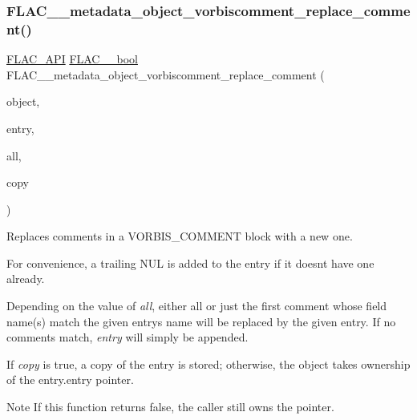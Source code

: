 \subsubsection{\texorpdfstring{FLAC\_\_metadata\_object\_vorbiscomment\_replace\_comment()}{FLAC\_\_metadata\_object\_vorbiscomment\_replace\_comment()}}
{\footnotesize\ttfamily \mbox{\hyperlink{group__flac__export_ga56ca07df8a23310707732b1c0007d6f5}{F\+L\+A\+C\+\_\+\+A\+PI}} \mbox{\hyperlink{ordinals_8h_a95103469f1cbd78b8cf250194985b34e}{F\+L\+A\+C\+\_\+\+\_\+bool}} F\+L\+A\+C\+\_\+\+\_\+metadata\+\_\+object\+\_\+vorbiscomment\+\_\+replace\+\_\+comment (\begin{DoxyParamCaption}\item[{\mbox{\hyperlink{struct_f_l_a_c_____stream_metadata}{F\+L\+A\+C\+\_\+\+\_\+\+Stream\+Metadata}} $\ast$}]{object,  }\item[{\mbox{\hyperlink{struct_f_l_a_c_____stream_metadata___vorbis_comment___entry}{F\+L\+A\+C\+\_\+\+\_\+\+Stream\+Metadata\+\_\+\+Vorbis\+Comment\+\_\+\+Entry}}}]{entry,  }\item[{\mbox{\hyperlink{ordinals_8h_a95103469f1cbd78b8cf250194985b34e}{F\+L\+A\+C\+\_\+\+\_\+bool}}}]{all,  }\item[{\mbox{\hyperlink{ordinals_8h_a95103469f1cbd78b8cf250194985b34e}{F\+L\+A\+C\+\_\+\+\_\+bool}}}]{copy }\end{DoxyParamCaption})}

Replaces comments in a V\+O\+R\+B\+I\+S\+\_\+\+C\+O\+M\+M\+E\+NT block with a new one.

For convenience, a trailing N\+UL is added to the entry if it doesn\textquotesingle{}t have one already.

Depending on the value of {\itshape all}, either all or just the first comment whose field name(s) match the given entry\textquotesingle{}s name will be replaced by the given entry. If no comments match, {\itshape entry} will simply be appended.

If {\itshape copy} is {\ttfamily true}, a copy of the entry is stored; otherwise, the object takes ownership of the {\ttfamily entry.\+entry} pointer.

\begin{DoxyNote}{Note}
If this function returns {\ttfamily false}, the caller still owns the pointer.
\end{DoxyNote}

